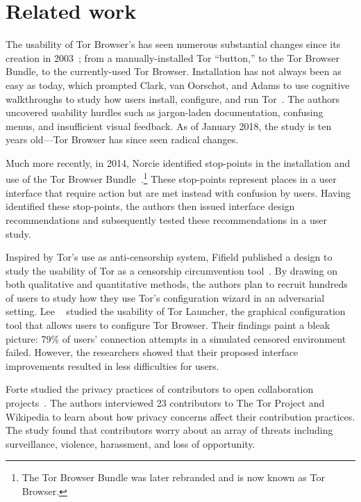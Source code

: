 \section{Related work}
\label{sec:related-work}

The usability of Tor Browser's has seen numerous substantial changes since its
creation in 2003~\cite{Syverson2005a}; from a manually-installed Tor ``button,''
to the Tor Browser Bundle, to the currently-used Tor Browser.  Installation has
not always been as easy as today, which prompted Clark, van Oorschot, and Adams
to use cognitive walkthroughs to study how users install, configure, and run
Tor~\cite{Clark2007a}.  The authors uncovered usability hurdles such as
jargon-laden documentation, confusing menus, and insufficient visual feedback.
As of January 2018, the study is ten years old---Tor Browser has since seen
radical changes.

Much more recently, in 2014, Norcie \ea identified stop-points in the
installation and use of the Tor Browser Bundle~\cite{Norcie2014a}.\footnote{The
Tor Browser Bundle was later rebranded and is now known as Tor Browser.}  These
stop-points represent places in a user interface that require action but are met
instead with confusion by users.  Having identified these stop-points, the
authors then issued interface design recommendations and subsequently tested
these recommendations in a user study.

Inspired by Tor's use as anti-censorship system, Fifield \ea published a design
to study the usability of Tor as a censorship circumvention
tool~\cite{Fifield2015a}.  By drawing on both qualitative and quantitative
methods, the authors plan to recruit hundreds of users to study how they use
Tor's configuration wizard in an adversarial setting.  Lee \ea~\cite{Lee2017a}
studied the usability of Tor Launcher, the graphical configuration tool that
allows users to configure Tor Browser.  Their findings paint a bleak picture:
79\% of users' connection attempts in a simulated censored environment failed.
However, the researchers showed that their proposed interface improvements
resulted in less difficulties for users.

Forte \ea studied the privacy practices of contributors to open collaboration
projects~\cite{Forte2017a}.  The authors interviewed 23 contributors to The Tor
Project and Wikipedia to learn about how privacy concerns affect their
contribution practices.  The study found that contributors worry about an array
of threats including surveillance, violence, harassment, and loss of
opportunity.

